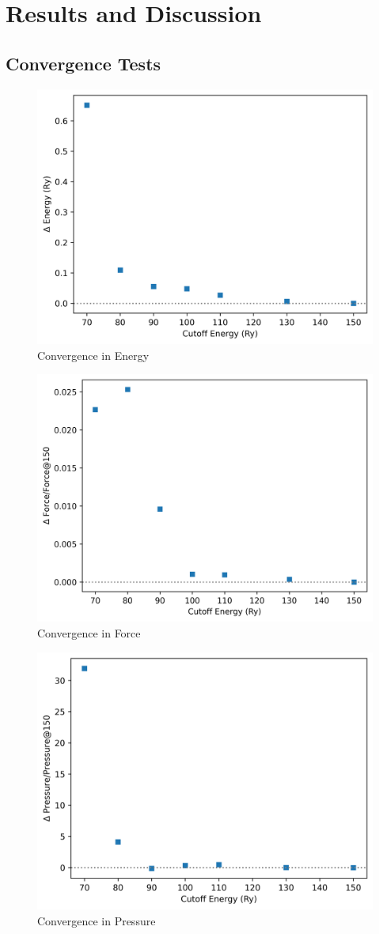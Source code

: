 \chapter{Results and Discussion}

\section{Convergence Tests}
\begin{figure}[h!]
  \centering
   \includegraphics[width=0.5\linewidth]{images/convergence/conv-energy.png}
  \caption{Convergence in Energy }
\end{figure}

\begin{figure}[h!]
  \centering
   \includegraphics[width=0.5\linewidth]{images/convergence/conv-force.png}
  \caption{Convergence in Force }
\end{figure}

\begin{figure}[h!]
  \centering
   \includegraphics[width=0.5\linewidth]{images/convergence/conv-pressure.png}
  \caption{Convergence in Pressure }
\end{figure}


